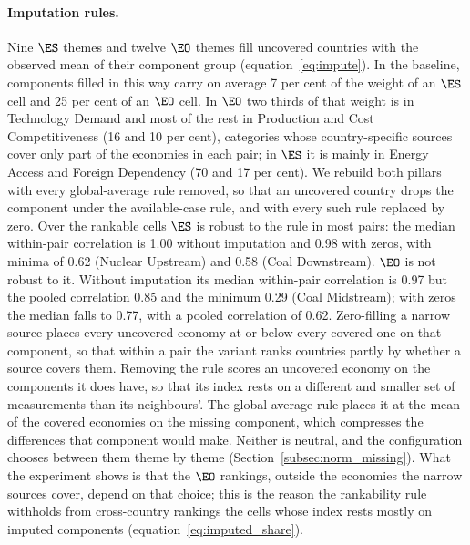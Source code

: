 \paragraph{Imputation rules.} Nine $\ES$ themes and twelve $\EO$ themes fill uncovered countries
with the observed mean of their component group (equation~\eqref{eq:impute}). In the baseline,
components filled in this way carry on average 7 per cent of the weight of an $\ES$ cell and
25 per cent of an $\EO$ cell. In $\EO$ two thirds of that weight is in Technology Demand and
most of the rest in Production and Cost Competitiveness (16 and 10 per cent), categories whose
country-specific sources cover only part of the economies in each pair; in $\ES$ it is mainly in
Energy Access and Foreign Dependency (70 and 17 per cent). We rebuild both pillars with every
global-average rule removed, so that an uncovered country drops the component under the
available-case rule, and with every such rule replaced by zero. Over the rankable cells $\ES$ is
robust to the rule in most pairs: the median within-pair correlation is 1.00 without imputation
and 0.98 with zeros, with minima of 0.62 (Nuclear Upstream) and 0.58 (Coal Downstream). $\EO$ is
not robust to it. Without imputation its median within-pair correlation is 0.97 but the pooled
correlation 0.85 and the minimum 0.29 (Coal Midstream); with zeros the median falls to 0.77,
with a pooled correlation of 0.62. Zero-filling a narrow source places every uncovered economy
at or below every covered one on that component, so that within a pair the variant ranks
countries partly by whether a source covers them. Removing the rule scores an uncovered economy
on the components it does have, so that its index rests on a different and smaller set of
measurements than its neighbours'. The global-average rule places it at the mean of the covered
economies on the missing component, which compresses the differences that component would
make. Neither is neutral, and the configuration chooses between them theme by theme
(Section~\ref{subsec:norm_missing}). What the experiment shows is that the $\EO$ rankings,
outside the economies the narrow sources cover, depend on that choice; this is the reason the
rankability rule withholds from cross-country rankings the cells whose index rests mostly on
imputed components (equation~\eqref{eq:imputed_share}).

